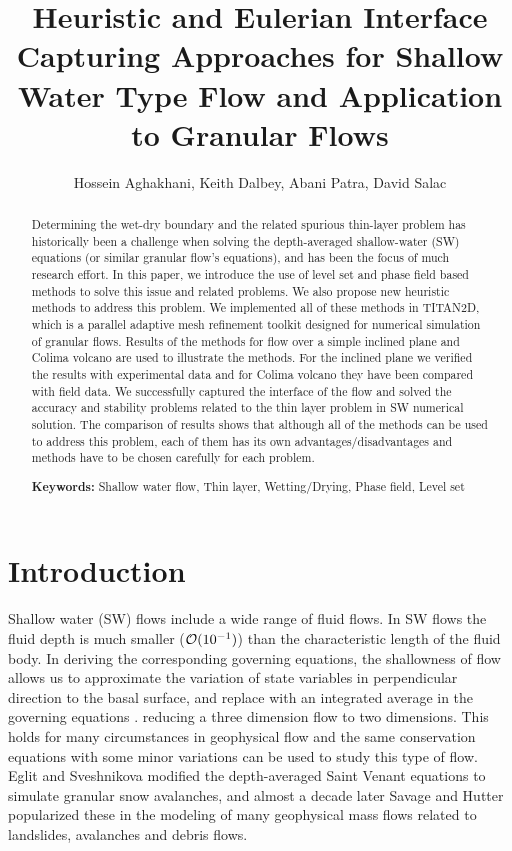 \documentclass[letterpaper,10pt]{article}
\title{Heuristic and Eulerian Interface Capturing Approaches for Shallow Water Type Flow and Application to Granular Flows }
\author{Hossein Aghakhani, Keith Dalbey, Abani Patra, David Salac}
\date{}
\begin{document}
\maketitle

\begin {abstract}{
Determining the wet-dry boundary and the related spurious thin-layer problem has historically been a challenge when 
solving the depth-averaged shallow-water (SW) equations (or similar granular flow's equations), and has 
been the focus of much research effort. In this paper, we introduce the use of level set and phase field based methods to solve this issue and  related problems. We also propose  new heuristic methods to address this problem. We implemented all of these methods in TITAN2D, which is a parallel adaptive mesh refinement toolkit designed for numerical simulation of granular flows. Results of the methods  for flow over a simple inclined plane and Colima volcano are used to illustrate the methods. For the inclined plane we verified the results with experimental data and for Colima volcano they have been compared with field data. We successfully captured the interface of the flow and solved the accuracy and stability problems related to the thin layer problem in SW numerical solution. The comparison of results shows that although all of the methods can be used to address this problem,   each of them has its own advantages/disadvantages and methods have to be chosen carefully for each problem.\newline

\textbf{Keywords:} Shallow water flow, Thin layer, Wetting/Drying, Phase field, Level set}
\end{abstract}

\section{Introduction} 
\label{introduction}
Shallow water (SW) flows include a wide range of fluid flows. In SW flows the fluid depth is much 
smaller (${\cal O}(10^{-1})$) than the characteristic length of the fluid body. In deriving the corresponding 
governing equations, the shallowness of flow allows us to approximate the variation of state variables  in perpendicular direction to the basal surface, and  replace
 with an integrated average in the governing equations \cite{SavageHutter1989}. 
reducing a  three dimension flow to two dimensions.
This holds for many circumstances in geophysical flow and the same 
conservation equations with some minor variations can be used to study this type of flow. 
 Eglit and Sveshnikova \cite{eglit1980mms} modified the depth-averaged Saint Venant equations to simulate granular snow avalanches, and almost a decade later Savage and Hutter \cite{SavageHutter1989} popularized these in the modeling of many  geophysical mass flows related to landslides, avalanches and debris flows. 
\end{document}
